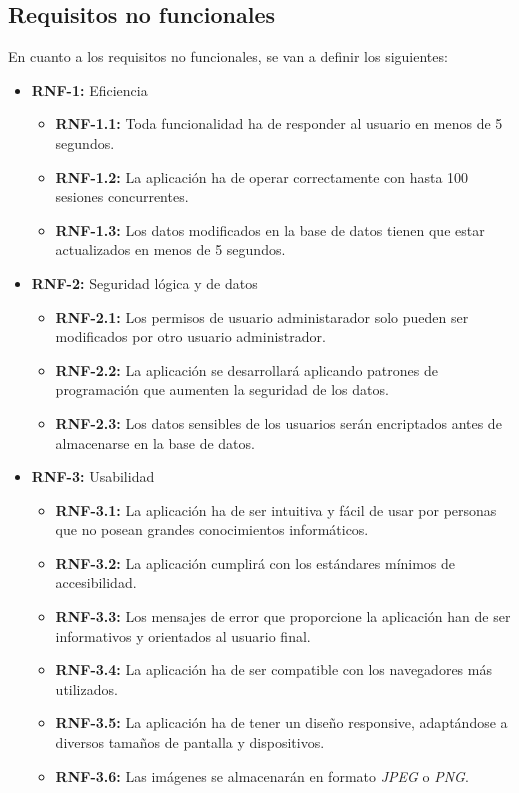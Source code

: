 \subsection{Requisitos no funcionales}
En cuanto a los requisitos no funcionales, se van a definir los siguientes:

\begin{itemize}
    \item \textbf{RNF-1:} Eficiencia
    \begin{itemize}
        \item \textbf{RNF-1.1:} Toda funcionalidad ha de responder al usuario en menos
        de 5 segundos.
        \item \textbf{RNF-1.2:} La aplicación ha de operar correctamente con hasta 100
        sesiones concurrentes.
        \item \textbf{RNF-1.3:} Los datos modificados en la base de datos tienen que
        estar actualizados en menos de 5 segundos.
    \end{itemize}
    \item \textbf{RNF-2:} Seguridad lógica y de datos
    \begin{itemize}
        \item \textbf{RNF-2.1:} Los permisos de usuario administarador solo pueden ser
        modificados por otro usuario administrador.
        \item \textbf{RNF-2.2:} La aplicación se desarrollará aplicando patrones de
        programación que aumenten la seguridad de los datos.
        \item \textbf{RNF-2.3:} Los datos sensibles de los usuarios serán encriptados
        antes de almacenarse en la base de datos.
    \end{itemize}
    \item \textbf{RNF-3:} Usabilidad
    \begin{itemize}
        \item \textbf{RNF-3.1:} La aplicación ha de ser intuitiva y fácil de usar por
        personas que no posean grandes conocimientos informáticos.
        \item \textbf{RNF-3.2:} La aplicación cumplirá con los estándares mínimos de
        accesibilidad.
        \item \textbf{RNF-3.3:} Los mensajes de error que proporcione la aplicación
        han de ser informativos y orientados al usuario final.
        \item \textbf{RNF-3.4:} La aplicación ha de ser compatible con los navegadores
        más utilizados.
        \item \textbf{RNF-3.5:} La aplicación ha de tener un diseño responsive, adaptándose
        a diversos tamaños de pantalla y dispositivos.
        \item \textbf{RNF-3.6:} Las imágenes se almacenarán en formato \textit{JPEG} o
        \textit{PNG}.
    \end{itemize}
\end{itemize}

